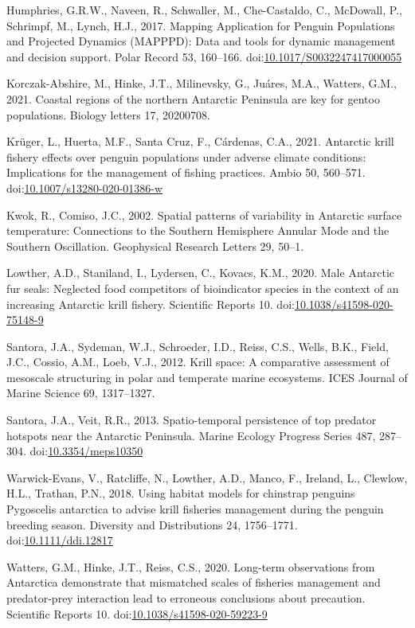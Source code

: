 \documentclass[]{elsarticle} %
\begin{document}
\leavevmode\hypertarget{ref-Humphries2017}{}%
Humphries, G.R.W., Naveen, R., Schwaller, M., Che-Castaldo, C.,
McDowall, P., Schrimpf, M., Lynch, H.J., 2017. Mapping Application for
Penguin Populations and Projected Dynamics (MAPPPD): Data and tools for
dynamic management and decision support. Polar Record 53, 160--166.
doi:\href{https://doi.org/10.1017/S0032247417000055}{10.1017/S0032247417000055}

\leavevmode\hypertarget{ref-korczak-abshireCoastalRegionsNorthern2021}{}%
Korczak-Abshire, M., Hinke, J.T., Milinevsky, G., Juáres, M.A., Watters,
G.M., 2021. Coastal regions of the northern Antarctic Peninsula are key
for gentoo populations. Biology letters 17, 20200708.

\leavevmode\hypertarget{ref-Kruger2021}{}%
Krüger, L., Huerta, M.F., Santa Cruz, F., Cárdenas, C.A., 2021.
Antarctic krill fishery effects over penguin populations under adverse
climate conditions: Implications for the management of fishing
practices. Ambio 50, 560--571.
doi:\href{https://doi.org/10.1007/s13280-020-01386-w}{10.1007/s13280-020-01386-w}

\leavevmode\hypertarget{ref-kwokSpatialPatternsVariability2002}{}%
Kwok, R., Comiso, J.C., 2002. Spatial patterns of variability in
Antarctic surface temperature: Connections to the Southern Hemisphere
Annular Mode and the Southern Oscillation. Geophysical Research Letters
29, 50--1.

\leavevmode\hypertarget{ref-Lowther2020}{}%
Lowther, A.D., Staniland, I., Lydersen, C., Kovacs, K.M., 2020. Male
Antarctic fur seals: Neglected food competitors of bioindicator species
in the context of an increasing Antarctic krill fishery. Scientific
Reports 10.
doi:\href{https://doi.org/10.1038/s41598-020-75148-9}{10.1038/s41598-020-75148-9}

\leavevmode\hypertarget{ref-santoraKrillSpaceComparative2012}{}%
Santora, J.A., Sydeman, W.J., Schroeder, I.D., Reiss, C.S., Wells, B.K.,
Field, J.C., Cossio, A.M., Loeb, V.J., 2012. Krill space: A comparative
assessment of mesoscale structuring in polar and temperate marine
ecosystems. ICES Journal of Marine Science 69, 1317--1327.

\leavevmode\hypertarget{ref-Santora2013}{}%
Santora, J.A., Veit, R.R., 2013. Spatio-temporal persistence of top
predator hotspots near the Antarctic Peninsula. Marine Ecology Progress
Series 487, 287--304.
doi:\href{https://doi.org/10.3354/meps10350}{10.3354/meps10350}

\leavevmode\hypertarget{ref-Warwick-Evans2018}{}%
Warwick-Evans, V., Ratcliffe, N., Lowther, A.D., Manco, F., Ireland, L.,
Clewlow, H.L., Trathan, P.N., 2018. Using habitat models for chinstrap
penguins Pygoscelis antarctica to advise krill fisheries management
during the penguin breeding season. Diversity and Distributions 24,
1756--1771.
doi:\href{https://doi.org/10.1111/ddi.12817}{10.1111/ddi.12817}

\leavevmode\hypertarget{ref-Watters2020}{}%
Watters, G.M., Hinke, J.T., Reiss, C.S., 2020. Long-term observations
from Antarctica demonstrate that mismatched scales of fisheries
management and predator-prey interaction lead to erroneous conclusions
about precaution. Scientific Reports 10.
doi:\href{https://doi.org/10.1038/s41598-020-59223-9}{10.1038/s41598-020-59223-9}
\end{document}
